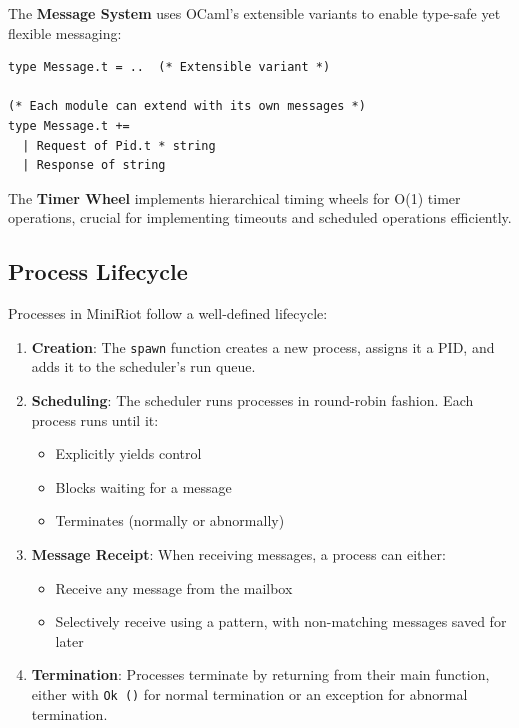 \documentclass[sigplan,screen]{acmart}
\begin{document}
The \textbf{Message System} uses OCaml's extensible variants to enable type-safe yet flexible messaging:

\begin{lstlisting}
type Message.t = ..  (* Extensible variant *)

(* Each module can extend with its own messages *)
type Message.t += 
  | Request of Pid.t * string
  | Response of string
\end{lstlisting}

The \textbf{Timer Wheel} implements hierarchical timing wheels for O(1) timer operations, crucial for implementing timeouts and scheduled operations efficiently.

\subsection{Process Lifecycle}

Processes in MiniRiot follow a well-defined lifecycle:

\begin{enumerate}
\item \textbf{Creation}: The \texttt{spawn} function creates a new process, assigns it a PID, and adds it to the scheduler's run queue.

\item \textbf{Scheduling}: The scheduler runs processes in round-robin fashion. Each process runs until it:
   \begin{itemize}
   \item Explicitly yields control
   \item Blocks waiting for a message
   \item Terminates (normally or abnormally)
   \end{itemize}

\item \textbf{Message Receipt}: When receiving messages, a process can either:
   \begin{itemize}
   \item Receive any message from the mailbox
   \item Selectively receive using a pattern, with non-matching messages saved for later
   \end{itemize}

\item \textbf{Termination}: Processes terminate by returning from their main function, either with \texttt{Ok ()} for normal termination or an exception for abnormal termination.
\end{enumerate}
\end{document}
